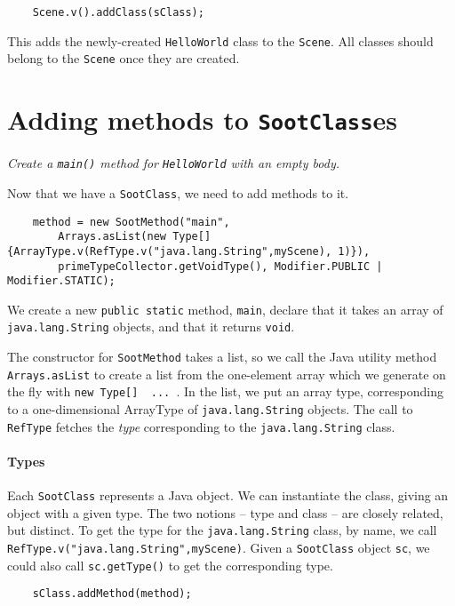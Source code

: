\documentclass{article}
\begin{document}
\noindent
\begin{verbatim}    Scene.v().addClass(sClass); \end{verbatim}

This adds the newly-created {\tt HelloWorld} class to the {\tt Scene}.  All classes
should belong to the {\tt Scene} once they are created.

\section{Adding methods to {\tt SootClass}es}

{\em Create a {\tt main()} method for {\tt HelloWorld} with an empty body.} 

Now that we have a {\tt SootClass}, we need to add methods to it.

\noindent
\begin{verbatim}
    method = new SootMethod("main",                 
        Arrays.asList(new Type[] {ArrayType.v(RefType.v("java.lang.String",myScene), 1)}),
        primeTypeCollector.getVoidType(), Modifier.PUBLIC | Modifier.STATIC);
\end{verbatim}

We create a new {\tt public static} method, {\tt main}, declare that it takes
an array of {\tt java.lang.String} objects, and that it returns {\tt void}.

The constructor for {\tt SootMethod} takes a list, so we call the Java
utility method {\tt Arrays.asList} to create a list from the
one-element array which we generate on the fly with
{\tt new Type[] { ... }}.  In the list, we put an array type,
corresponding to a one-dimensional ArrayType of {\tt java.lang.String}
objects.  The call to {\tt RefType} fetches the {\em type}
corresponding to the {\tt java.lang.String} class.

\paragraph{Types} Each {\tt SootClass} represents a Java object.  We can
instantiate the class, giving an object with a given type.  The two
notions -- type and class -- are closely related, but distinct.  To
get the type for the {\tt java.lang.String} class, by name, we call
{\tt RefType.v("java.lang.String",myScene)}.  Given a {\tt SootClass} object
{\tt sc}, we could also call {\tt sc.getType()} to get the
corresponding type.

\noindent
\begin{verbatim}    sClass.addMethod(method); \end{verbatim}
\end{document}
